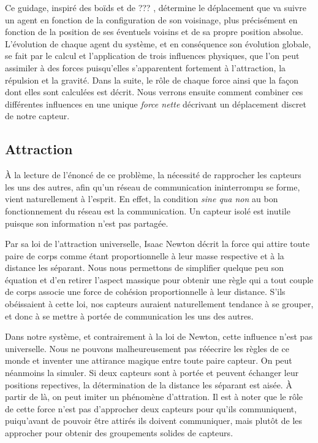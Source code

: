\documentclass[10pt]{article}
\begin{document}
\begin{multicols}{2}
Ce guidage, inspiré des boïds \cite{Reynolds1987} et de ???
\cite{Cheng2011497}, détermine le déplacement que va suivre un agent
en fonction de la configuration de son voisinage, plus précisément en
fonction de la position de ses éventuels voisins et de sa propre
position absolue. L'évolution de chaque agent du système, et en
conséquence son évolution globale, se fait par le calcul et
l'application de trois influences physiques, que l'on peut assimiler à
des forces puisqu'elles s'apparentent fortement à l'attraction, la
répulsion et la gravité. Dans la suite, le rôle de chaque force ainsi
que la façon dont elles sont calculées est décrit. Nous verrons
ensuite comment combiner ces différentes influences en une unique
\textit{force nette} décrivant un déplacement discret de notre
capteur.

\subsection{Attraction}

\`A la lecture de l'énoncé de ce problème, la nécessité de rapprocher
les capteurs les uns des autres, afin qu'un réseau de communication
ininterrompu se forme, vient naturellement à l'esprit. En effet, la
condition \textit{sine qua non} au bon fonctionnement du réseau est la
communication. Un capteur isolé est inutile puisque son
information n'est pas partagée.

Par sa loi de l'attraction universelle, Isaac Newton décrit la force
qui attire toute paire de corps comme étant proportionnelle à leur
masse respective et à la distance les séparant. Nous nous permettons
de simplifier quelque peu son équation et d'en retirer l'aspect
massique pour obtenir une règle qui a tout couple de corps associe une
force de cohésion proportionnelle à leur distance. S'ils obéissaient à
cette loi, nos capteurs auraient naturellement tendance à se grouper,
et donc à se mettre à portée de communication les uns des autres.

Dans notre système, et contrairement à la loi de Newton, cette
influence n'est pas universelle. Nous ne pouvons malheureusement pas
rééecrire les règles de ce monde et inventer une attirance magique
entre toute paire capteur. On peut néanmoins la simuler. Si deux
capteurs sont à portée et peuvent échanger leur positions repectives,
la détermination de la distance les séparant est aisée. \`A partir de
là, on peut imiter un phénomène d'attration. Il est à noter que le
rôle de cette force n'est pas d'approcher deux capteurs pour qu'ils
communiquent, puiqu'avant de pouvoir être attirés ils doivent
communiquer, mais plutôt de les approcher pour obtenir des groupements
solides de capteurs.


\end{multicols}
\end{document}
